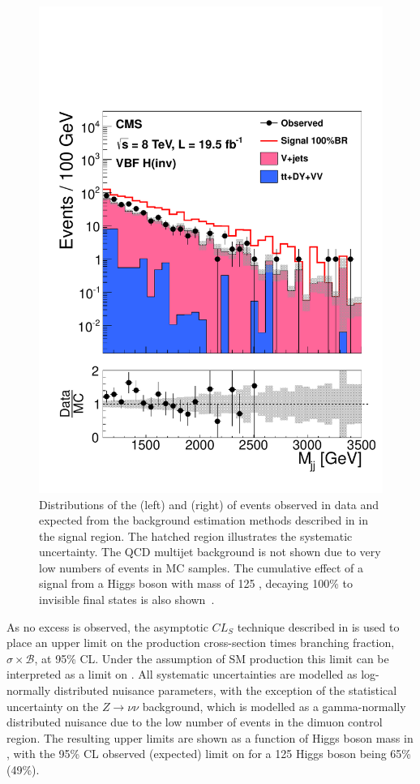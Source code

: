 \begin{figure}
  \includegraphics[width=.6\largefigwidth]{plots/prompt/AN-12-403-figs/SignalRegionMjj.pdf}
  \caption{Distributions of the \MET (left) and \Mjj (right) of events observed in data and expected from the background estimation methods described in  in the signal region. The hatched region illustrates the systematic uncertainty. The QCD multijet background is not shown due to very low numbers of events in \ac{MC} samples. The cumulative effect of a signal from a Higgs boson with mass of 125 \GeV, decaying 100\% to invisible final states is also shown~\cite{Chatrchyan:2014tja}.}
  \label{fig:promptresults}
\end{figure}

As no excess is observed, the asymptotic $CL_{S}$ technique described in  is used to place an upper limit on the production cross-section times branching fraction, $\sigma\times\mathcal{B}$, at 95\% CL. Under the assumption of \ac{SM} production this limit can be interpreted as a limit on \BRinv. All systematic uncertainties are modelled as log-normally distributed nuisance parameters, with the exception of the statistical uncertainty on the $Z\rightarrow\nu\nu$ background, which is modelled as a gamma-normally distributed nuisance due to the low number of events in the dimuon control region. The resulting upper limits are shown as a function of Higgs boson mass in , with the 95\% CL observed (expected) limit on \BRinv for a 125 \GeV Higgs boson being 65\% (49\%).

